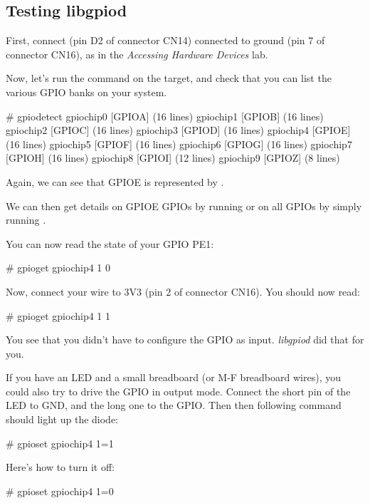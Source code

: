 \subsection{Testing libgpiod}

First, connect  (pin D2 of connector CN14) connected
to ground (pin 7 of connector CN16), as in the
{\em Accessing Hardware Devices} lab.

Now, let's run the  command on the target, and check that
you can list the various GPIO banks on your system.

\begin{bashinput}
# gpiodetect
gpiochip0 [GPIOA] (16 lines)
gpiochip1 [GPIOB] (16 lines)
gpiochip2 [GPIOC] (16 lines)
gpiochip3 [GPIOD] (16 lines)
gpiochip4 [GPIOE] (16 lines)
gpiochip5 [GPIOF] (16 lines)
gpiochip6 [GPIOG] (16 lines)
gpiochip7 [GPIOH] (16 lines)
gpiochip8 [GPIOI] (12 lines)
gpiochip9 [GPIOZ] (8 lines)
\end{bashinput}

Again, we can see that GPIOE is represented by .

We can then get details on GPIOE GPIOs by running  or on all GPIOs by simply running .

You can now read the state of your GPIO PE1:

\begin{bashinput}
# gpioget gpiochip4 1
0
\end{bashinput}

Now, connect your wire to 3V3 (pin 2 of connector CN16). You should now
read:

\begin{bashinput}
# gpioget gpiochip4 1
1
\end{bashinput}

You see that you didn't have to configure the GPIO as input. {\em
libgpiod} did that for you.

If you have an LED and a small breadboard (or M-F breadboard wires),
you could also try to drive the GPIO in output mode. Connect the short
pin of the LED to GND, and the long one to the GPIO. Then then following
command should light up the diode:

\begin{bashinput}
# gpioset gpiochip4 1=1
\end{bashinput}

Here's how to turn it off:

\begin{bashinput}
# gpioset gpiochip4 1=0
\end{bashinput}

